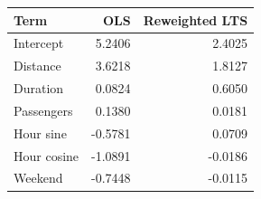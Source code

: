 \begin{tabular}{lrr}
\toprule
Term & OLS & Reweighted LTS \\
\midrule
Intercept & 5.2406 & 2.4025 \\
Distance & 3.6218 & 1.8127 \\
Duration & 0.0824 & 0.6050 \\
Passengers & 0.1380 & 0.0181 \\
Hour sine & -0.5781 & 0.0709 \\
Hour cosine & -1.0891 & -0.0186 \\
Weekend & -0.7448 & -0.0115 \\
\bottomrule
\end{tabular}
